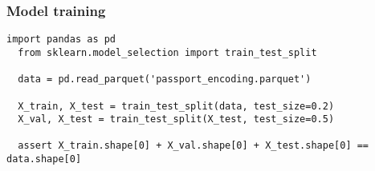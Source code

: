 \subsubsection{Model training}

\begin{lstlisting}[caption={Dataset splitting},label={lst:data_splitting}]
  import pandas as pd
  from sklearn.model_selection import train_test_split

  data = pd.read_parquet('passport_encoding.parquet')

  X_train, X_test = train_test_split(data, test_size=0.2)
  X_val, X_test = train_test_split(X_test, test_size=0.5)

  assert X_train.shape[0] + X_val.shape[0] + X_test.shape[0] == data.shape[0]
\end{lstlisting}

